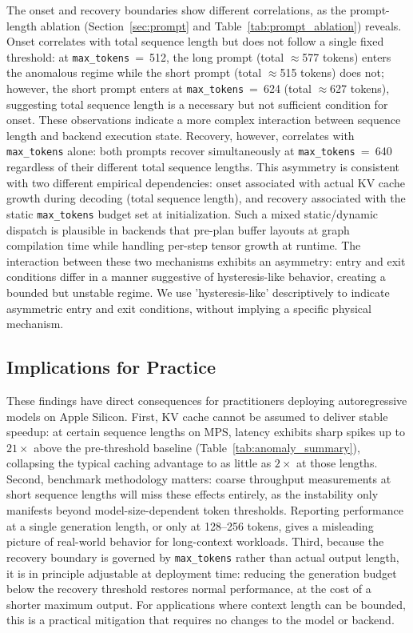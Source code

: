 \documentclass{article}
\begin{document}
The onset and recovery boundaries show different correlations, as the prompt-length ablation (Section~\ref{sec:prompt} and Table~\ref{tab:prompt_ablation}) reveals.
Onset correlates with total sequence length but does not follow a single fixed threshold: at \texttt{max\_tokens}~=~512, the long prompt (total $\approx$577 tokens) enters the anomalous regime while the short prompt (total $\approx$515 tokens) does not; however, the short prompt enters at \texttt{max\_tokens}~=~624 (total $\approx$627 tokens), suggesting total sequence length is a necessary but not sufficient condition for onset. These observations indicate a more complex interaction between sequence length and backend execution state.
Recovery, however, correlates with \texttt{max\_tokens} alone: both prompts recover simultaneously at \texttt{max\_tokens}~=~640 regardless of their different total sequence lengths.
This asymmetry is consistent with two different empirical dependencies: onset associated with actual KV cache growth during decoding (total sequence length), and recovery associated with the static \texttt{max\_tokens} budget set at initialization.
Such a mixed static/dynamic dispatch is plausible in backends that pre-plan buffer layouts at graph compilation time while handling per-step tensor growth at runtime. The interaction between these two mechanisms exhibits an asymmetry: entry and exit conditions differ in a manner suggestive of hysteresis-like behavior, creating a bounded but unstable regime. We use 'hysteresis-like' descriptively to indicate asymmetric entry and exit conditions, without implying a specific physical mechanism.

\subsection{Implications for Practice}

These findings have direct consequences for practitioners deploying autoregressive models on Apple Silicon.
First, KV cache cannot be assumed to deliver stable speedup: at certain sequence lengths on MPS, latency exhibits sharp spikes up to $21\times$ above the pre-threshold baseline (Table~\ref{tab:anomaly_summary}), collapsing the typical caching advantage to as little as $2\times$ at those lengths.
Second, benchmark methodology matters: coarse throughput measurements at short sequence lengths will miss these effects entirely, as the instability only manifests beyond model-size-dependent token thresholds.
Reporting performance at a single generation length, or only at 128--256 tokens, gives a misleading picture of real-world behavior for long-context workloads.
Third, because the recovery boundary is governed by \texttt{max\_tokens} rather than actual output length, it is in principle adjustable at deployment time: reducing the generation budget below the recovery threshold restores normal performance, at the cost of a shorter maximum output.
For applications where context length can be bounded, this is a practical mitigation that requires no changes to the model or backend.
\end{document}
